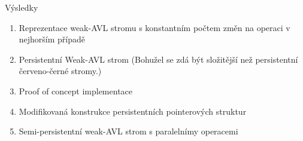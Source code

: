 \documentclass{beamer}
\theoremstyle{mytheoremstyle}
\begin{document}
\begin{frame}{Výsledky}
\begin{enumerate}
\item
Reprezentace weak-AVL stromu s konstantním počtem změn na operaci v nejhorším případě
\item
Persistentní Weak-AVL strom (Bohužel se zdá být složitější než persistentní červeno-černé stromy.)
\item
Proof of concept implementace
\item
Modifikovaná konstrukce persistentních pointerových struktur
\item
Semi-persistentní weak-AVL strom s paralelnímy operacemi
\end{enumerate}
\end{frame}
\end{document}

